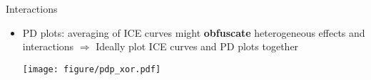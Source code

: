 \documentclass[10pt,compress,t,notes=noshow, xcolor=table]{beamer}
\begin{document}
%
%

\begin{frame}{Interactions}
\begin{itemize}

\item PD plots: averaging of ICE curves might \textbf{obfuscate} heterogeneous effects and interactions \newline \(\Rightarrow\) Ideally plot ICE curves and PD plots together

\begin{center}\texttt{[image: figure/pdp\_xor.pdf]} \end{center}
\end{itemize}

\end{frame}


\endlecture
\end{document}
